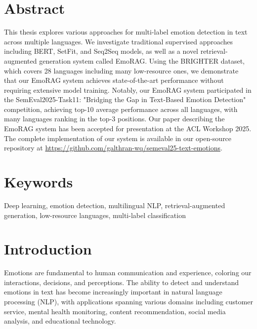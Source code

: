 \documentclass[a4paper,12pt]{extarticle}
\begin{document}
{\selectfont

}
\newpage
\setcounter{page}{2}

\selectfont
{}

{
	\hypersetup{linkcolor=black}
	\tableofcontents
}

\newpage

\section*{Abstract}

This thesis explores various approaches for multi-label emotion detection in text across multiple languages. 
We investigate traditional supervised approaches including BERT, SetFit, and Seq2Seq models, as well as a novel retrieval-augmented generation system called EmoRAG. 
Using the BRIGHTER dataset, which covers 28 languages including many low-resource ones, we demonstrate that our EmoRAG system achieves state-of-the-art performance without requiring extensive model training. 
Notably, our EmoRAG system participated in the SemEval2025-Task11: "Bridging the Gap in Text-Based Emotion Detection" competition, achieving top-10 average performance across all languages, with many languages ranking in the top-3 positions. 
Our paper describing the EmoRAG system has been accepted for presentation at the ACL Workshop 2025. The complete implementation of our system is available in our open-source repository at \url{https://github.com/galthran-wq/semeval25-text-emotions}.


\section*{Keywords}
Deep learning, emotion detection, multilingual NLP, retrieval-augmented generation, low-resource languages, multi-label classification

\section{Introduction}

Emotions are fundamental to human communication and experience, coloring our interactions, decisions, and perceptions. The ability to detect and understand emotions in text has become increasingly important in natural language processing (NLP), with applications spanning various domains including customer service, mental health monitoring, content recommendation, social media analysis, and educational technology.
\end{document}
